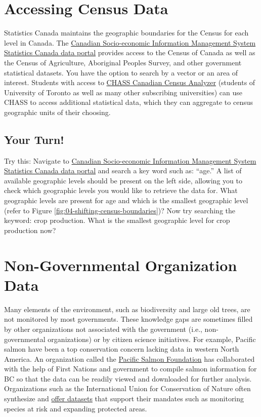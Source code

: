 \documentclass[
]{book}
\begin{document}
\hypertarget{accessing-census-data}{%
\section{Accessing Census Data}\label{accessing-census-data}}

Statistics Canada maintains the geographic boundaries for the Census for each level in Canada. The \href{https://www150.statcan.gc.ca/n1/en/type/data}{Canadian Socio-economic Information Management System Statistics Canada data portal} provides access to the Census of Canada as well as the Census of Agriculture, Aboriginal Peoples Survey, and other government statistical datasets. You have the option to search by a vector or an area of interest. Students with access to \href{http://dc1.chass.utoronto.ca/census/index.html}{CHASS Canadian Census Analyzer} (students of University of Toronto as well as many other subscribing universities) can use CHASS to access additional statistical data, which they can aggregate to census geographic units of their choosing.

\hypertarget{your-turn-3}{%
\subsection*{Your Turn!}\label{your-turn-3}}

Try this: Navigate to \href{https://www150.statcan.gc.ca/n1/en/type/data}{Canadian Socio-economic Information Management System Statistics Canada data portal} and search a key word such as: ``age.'' A list of available geographic levels should be present on the left side, allowing you to check which geographic levels you would like to retrieve the data for. What geographic levels are present for age and which is the smallest geographic level (refer to Figure \ref{fig:04-shifting-census-boundaries})? Now try searching the keyword: crop production. What is the smallest geographic level for crop production now?

\hypertarget{non-governmental-organization-data}{%
\section{Non-Governmental Organization Data}\label{non-governmental-organization-data}}

Many elements of the environment, such as biodiversity and large old trees, are not monitored by most governments. These knowledge gaps are sometimes filled by other organizations not associated with the government (i.e., non-governmental organizations) or by citizen science initiatives. For example, Pacific salmon have been a top conservation concern lacking data in western North America. An organization called the \href{https://www.salmonexplorer.ca/\#!/}{Pacific Salmon Foundation} has collaborated with the help of First Nations and government to compile salmon information for BC so that the data can be readily viewed and downloaded for further analysis. Organizations such as the International Union for Conservation of Nature often synthesize and \href{https://www.iucn.org/resources/conservation-tools}{offer datasets} that support their mandates such as monitoring species at risk and expanding protected areas.
\end{document}
